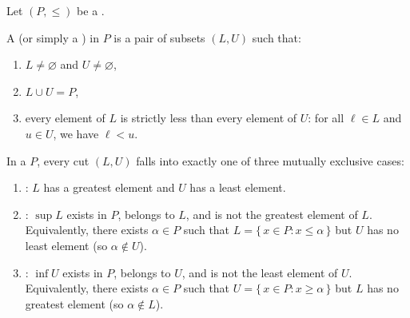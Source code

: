 \begin{definition} \label{definition:dedekind_cut_in_an_ordered_set}
    Let $(P, \leq)$ be a .

    A  (or simply a ) in $P$ is a pair of subsets $(L, U)$ such that:
    \begin{enumerate}
        \item $L \neq \varnothing$ and $U \neq \varnothing$,
        \item $L \cup U = P$,
        \item every element of $L$ is strictly less than every element of $U$: for all $\ell \in L$ and $u \in U$, we have $\ell < u$.
    \end{enumerate}

    In a  $P$, every cut $(L, U)$ falls into exactly one of three mutually exclusive cases:
    \begin{enumerate}
        \item {}: $L$ has a greatest element and $U$ has a least element.
        \item {}: $\sup L$ exists in $P$, belongs to $L$, and is not the greatest element of $L$. Equivalently, there exists $\alpha \in P$ such that $L = \{\,x \in P : x \leq \alpha\,\}$ but $U$ has no least element (so $\alpha \notin U$).
        \item {}: $\inf U$ exists in $P$, belongs to $U$, and is not the least element of $U$. Equivalently, there exists $\alpha \in P$ such that $U = \{\,x \in P : x \geq \alpha\,\}$ but $L$ has no greatest element (so $\alpha \notin L$).
    \end{enumerate}
\end{definition}
